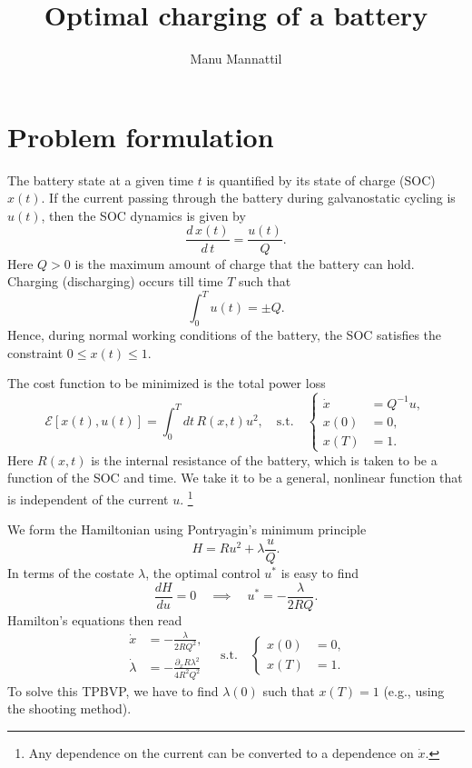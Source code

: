 \documentclass[11pt]{article}
\begin{document}
\title{Optimal charging of a battery}
\author{Manu Mannattil}
\maketitle

\section{Problem formulation}

The battery state at a given time $t$ is quantified by its state of charge (SOC) $x(t)$.
If the current passing through the battery during galvanostatic cycling is $u(t)$, then the SOC dynamics is given by
%
\begin{equation}
  \frac{d\, x(t)}{d\, t} = \frac{u(t)}{Q}.
\end{equation}
%
Here $Q > 0$ is the maximum amount of charge that the battery can hold.
Charging (discharging) occurs till time $T$ such that
%
\begin{equation}
  \int_{0}^{T} u(t) = \pm Q.
\end{equation}
%
Hence, during normal working conditions of the battery, the SOC satisfies the constraint $0 \leq x(t) \leq 1$.

The cost function to be minimized is the total power loss
%
\begin{equation}
  \mathcal{E}[x(t), u(t)] = \int_{0}^{T}dt\, R(x, t) u^{2},
  \quad
  \text{s.t.}
  \quad
  \left\{
  \begin{aligned}
    \dot{x} &= Q^{-1}u,\\
    x(0) &= 0,\\
    x(T) &= 1.
  \end{aligned}
  \right.
\end{equation}
%
Here $R(x, t)$ is the internal resistance of the battery, which is taken to be a function of the SOC and time.
We take it to be a general, nonlinear function that is independent of the current $u$.%
\footnote{Any dependence on the current can be converted to a dependence on $\dot{x}$.}

We form the Hamiltonian using Pontryagin's minimum principle
%
\begin{equation}
  H = R u^{2} + \lambda \frac{u}{Q}.
\end{equation}
%
In terms of the costate $\lambda$, the optimal control $u^{*}$ is easy to find
%
\begin{equation}
  \frac{dH}{du} = 0
  \quad
  \implies
  \quad
  u^{*} = -\frac{\lambda}{2RQ}.
\end{equation}
%
Hamilton's equations then read
%
\begin{equation}
%
\begin{aligned}
  \dot{x} &= -\frac{\lambda}{2RQ^{2}},\\
  \dot{\lambda} &= -\frac{\partial_{x}R\lambda^{2}}{4R^{2}Q^{2}}
\end{aligned}
%
\quad
\text{s.t.}
\quad
\left\{
\begin{aligned}
  x(0) &= 0,\\
  x(T) &= 1.
\end{aligned}
\right.
\end{equation}
%
To solve this TPBVP, we have to find $\lambda(0)$ such that $x(T) = 1$ (e.g., using the shooting method).
\end{document}

